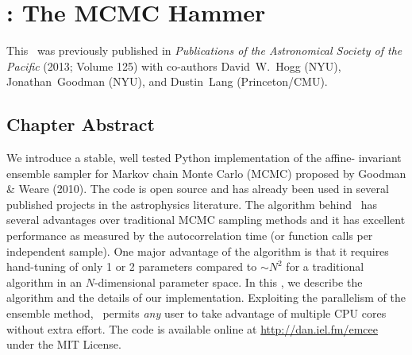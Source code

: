 \newcommand{\thisplain}{emcee}
\newcommand{\this}{\project{\thisplain}}
\newcommand{\license}{MIT License}
\newcommand{\Python}{\project{Python}}
\newcommand{\numpy}{\project{numpy}}
\newcommand{\Ubuntu}{\project{Ubuntu}}
\newcommand{\github}{\project{GitHub}}
\newcommand{\pip}{\project{pip}}
\newcommand{\acor}{\project{acor}}

\newcommand{\model}{\ensuremath{\vector{\Theta}}}
\newcommand{\data}{\ensuremath{\vector{D}}}
\newcommand{\nuisance}{\ensuremath{\vector{\alpha}}}
\newcommand{\link}{\ensuremath{X}}
\newcommand{\ensemble}{S}
\newcommand{\colorens}[1]{\ensemble^{(#1)}}
\newcommand{\red}{\colorens{0}}
\newcommand{\blue}{\colorens{1}}
\renewcommand{\vector}[1]{#1}
\renewcommand{\matrix}[1]{#1}

\chapter{\this: The MCMC Hammer\label{chap:emcee}}

This \paper\ was previously published in \emph{Publications of the
Astronomical Society of the Pacific} (2013; Volume 125) with co-authors
David~W.~Hogg (NYU), Jonathan~Goodman (NYU), and Dustin~Lang (Princeton/CMU).

\section{Chapter Abstract}

We introduce a stable, well tested Python implementation of the affine-%
invariant ensemble sampler for Markov chain Monte Carlo (MCMC)
proposed by Goodman \& Weare (2010). The code is open source and has
already been used in several published projects in the astrophysics
literature. The algorithm behind \this\ has several advantages over
traditional MCMC sampling methods and it has excellent performance as
measured by the autocorrelation time (or function calls per independent sample).
One major advantage of the algorithm is that it requires hand-tuning of
only 1 or 2 parameters compared to $\sim N^2$ for
a traditional algorithm in an $N$-dimensional parameter space. In this
\paper, we describe the algorithm and the details of our implementation.
Exploiting the parallelism of the ensemble method,
\this\ permits \emph{any} user to take advantage of
multiple CPU cores without extra effort.  The code is available online
at \url{http://dan.iel.fm/\thisplain} under the \license.

